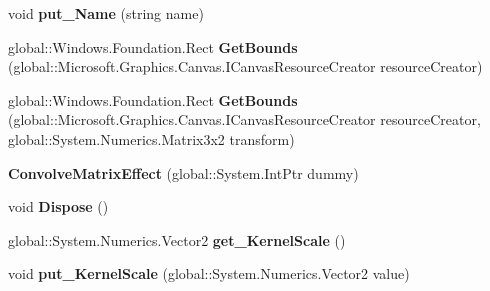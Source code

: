 \begin{DoxyCompactItemize}
void {\bfseries put\+\_\+\+Name} (string name)
\item 
\mbox{\label{class_microsoft_1_1_graphics_1_1_canvas_1_1_effects_1_1_convolve_matrix_effect_a4447c7b37ba50f6a56fcab8c7162ef14}} 
global\+::\+Windows.\+Foundation.\+Rect {\bfseries Get\+Bounds} (global\+::\+Microsoft.\+Graphics.\+Canvas.\+I\+Canvas\+Resource\+Creator resource\+Creator)
\item 
\mbox{\label{class_microsoft_1_1_graphics_1_1_canvas_1_1_effects_1_1_convolve_matrix_effect_a9217d8a4ac41858e50073c043f56fb29}} 
global\+::\+Windows.\+Foundation.\+Rect {\bfseries Get\+Bounds} (global\+::\+Microsoft.\+Graphics.\+Canvas.\+I\+Canvas\+Resource\+Creator resource\+Creator, global\+::\+System.\+Numerics.\+Matrix3x2 transform)
\item 
\mbox{\label{class_microsoft_1_1_graphics_1_1_canvas_1_1_effects_1_1_convolve_matrix_effect_a5b7d51fb8ea576cdec1344b34f9bf8ff}} 
{\bfseries Convolve\+Matrix\+Effect} (global\+::\+System.\+Int\+Ptr dummy)
\item 
\mbox{\label{class_microsoft_1_1_graphics_1_1_canvas_1_1_effects_1_1_convolve_matrix_effect_ade7c5a61826ba4eb1335c485b77bb198}} 
void {\bfseries Dispose} ()
\item 
\mbox{\label{class_microsoft_1_1_graphics_1_1_canvas_1_1_effects_1_1_convolve_matrix_effect_a6d9159be1d73df73a313b7b99727f4e7}} 
global\+::\+System.\+Numerics.\+Vector2 {\bfseries get\+\_\+\+Kernel\+Scale} ()
\item 
\mbox{\label{class_microsoft_1_1_graphics_1_1_canvas_1_1_effects_1_1_convolve_matrix_effect_a6fec289269f130b154319296dc96911f}} 
void {\bfseries put\+\_\+\+Kernel\+Scale} (global\+::\+System.\+Numerics.\+Vector2 value)
\item 
\mbox{\label{class_microsoft_1_1_graphics_1_1_canvas_1_1_effects_1_1_convolve_matrix_effect_af57f00feab944bdafee4121511d98b7b}} 

\end{DoxyCompactItemize}
